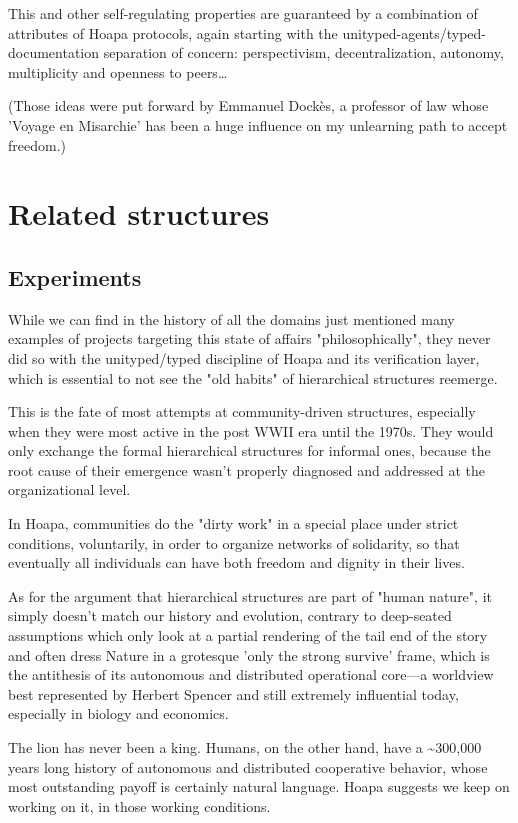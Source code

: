 \documentclass[11pt]{article}
\begin{document}
This and other self-regulating properties are guaranteed by a combination of attributes of Hoapa protocols, again starting with the unityped-agents/typed-documentation separation of concern: perspectivism, decentralization, autonomy, multiplicity and openness to peers\ldots{}

(Those ideas were put forward by Emmanuel Dockès, a professor of law whose 'Voyage en Misarchie' has been a huge influence on my unlearning path to accept freedom.)

\section{Related structures}

\subsection{Experiments}

While we can find in the history of all the domains just mentioned many examples of projects targeting this state of affairs "philosophically", they never did so with the unityped/typed discipline of Hoapa and its verification layer, which is essential to not see the "old habits" of hierarchical structures reemerge.

This is the fate of most attempts at community-driven structures, especially when they were most active in the post WWII era until the 1970s. They would only exchange the formal hierarchical structures for informal ones, because the root cause of their emergence wasn't properly diagnosed and addressed at the organizational level.

In Hoapa, communities do the "dirty work" in a special place under strict conditions, voluntarily, in order to organize networks of solidarity, so that eventually all individuals can have both freedom and dignity in their lives.

As for the argument that hierarchical structures are part of "human nature", it simply doesn't match our history and evolution, contrary to deep-seated assumptions which only look at a partial rendering of the tail end of the story and often dress Nature in a grotesque 'only the strong survive' frame, which is the antithesis of its autonomous and distributed operational core---a worldview best represented by Herbert Spencer and still extremely influential today, especially in biology and economics.

The lion has never been a king. Humans, on the other hand, have a \textasciitilde{}300,000 years long history of autonomous and distributed cooperative behavior, whose most outstanding payoff is certainly natural language. Hoapa suggests we keep on working on it, in those working conditions.
\end{document}
